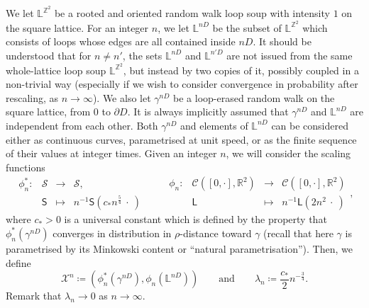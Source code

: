\documentclass[11pt]{article}
\begin{document}
We let $\mathbb{L}^{\mathbb{Z}^2}$ be a rooted and oriented random walk loop soup with intensity $1$ on the square lattice. For an integer $n$, we let $\mathbb{L}^{nD}$ be the subset of $\mathbb{L}^{\mathbb{Z}^2}$ which consists of loops whose edges are all contained  inside $nD$. It should be understood that for $n\neq n'$, the sets $\mathbb{L}^{nD}$ and $\mathbb{L}^{n'D}$ are not issued from the same whole-lattice loop soup $\mathbb{L}^{\mathbb{Z}^2}$,
but instead by two copies of it, possibly coupled in a non-trivial way (especially if we wish to consider convergence in probability after rescaling, as $n\to\infty$).
We also let $\gamma^{nD}$ be a loop-erased random walk on the square lattice, from $0$ to $\partial D$. It is always implicitly assumed that $\gamma^{nD}$ and $\mathbb{L}^{nD}$ are independent from each other.
Both $\gamma^{nD}$ and elements of $\mathbb{L}^{nD}$ can be considered either as continuous curves, parametrised at unit speed, or as the finite sequence of their values at integer times. Given an integer $n$, we will consider the scaling functions
\[
\begin{array}{cccc} \phi^*_{n}:& \mathscr{S} &\to & \mathscr{S}, \\ &\mathsf{S}&\mapsto &  n^{-1}\mathsf{S}( c_* n^{\frac{5}{4}}  \ \cdot \ )\end{array} \qquad
\begin{array}{cccc}\phi_n:& \mathcal{C}([0,\cdot],\mathbb{R}^2)&\to & \mathcal{C}([0,\cdot],\mathbb{R}^2) \\ &\mathsf{L}&\mapsto &  n^{-1}\mathsf{L}(2 n^2  \ \cdot \   )\end{array},
\]
where $c_*>0$ is a universal constant which is defined by the property that $\phi^*_n(\gamma^{nD})$ converges in distribution in $\rho$-distance toward $\gamma$ (recall that here $\gamma$ is parametrised by its Minkowski content or ``natural parametrisation'').
Then, we define \[ \mathcal{X}^n\coloneqq ( \phi^*_n(\gamma^{nD}), \phi_n( \mathbb{L}^{nD}  )   ) \qquad \mbox{and} \qquad \lambda_n\coloneqq \frac{c_*}{2}n^{-\frac{3}{4}}.\] Remark that $\lambda_n\to 0$ as $n\to \infty$.
\end{document}
